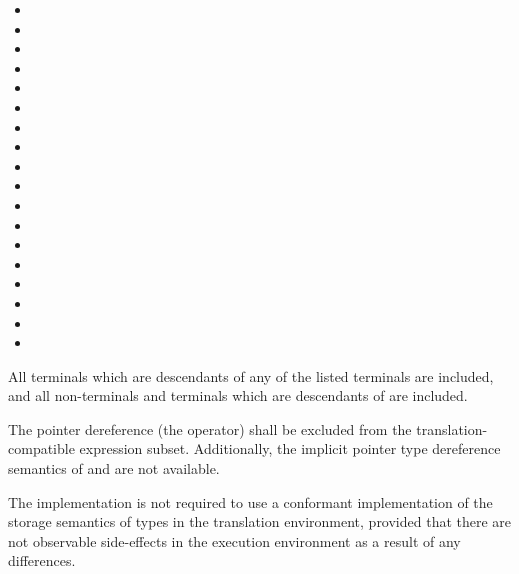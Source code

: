 \begin{minipage}[t][7cm][b]{\textwidth}
\begin{multicols}{2}
\begin{itemize}
\item {}
\item {}
\item {}
\item {}
\item {}
\item {}
\item {}
\item {}
\item {}
\item {}
\item {}
\item {}
\item {}
\item {}
\item {}
\item {}
\item {}
\item {}
\end{itemize}
\end{multicols}
\end{minipage}

\vspace{0.25cm}
\specsubitem
All terminals which are descendants of any of the listed terminals are
included, and all non-terminals and terminals which are descendants of
 are included.

\specsubitem
The pointer dereference  (the \terminal{*}
operator) shall be excluded from the translation-compatible expression subset.
Additionally, the implicit pointer type dereference semantics of
 and  are
not available.

\specsubitem
The implementation is not required to use a conformant implementation of the
storage semantics of types in the translation environment, provided that there
are not observable side-effects in the execution environment as a result of any
differences.

